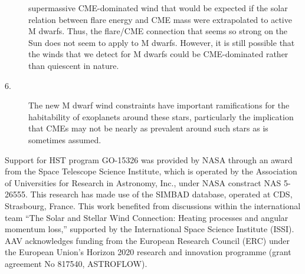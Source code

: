 \documentclass[preprint]{aastex}
\begin{document}
\begin{description}
  supermassive CME-dominated wind that would be expected if the solar
  relation between flare energy and CME mass were extrapolated to
  active M dwarfs.  Thus, the flare/CME connection that seems so strong on the
  Sun \citep[e.g.,][]{ana11} does not seem to apply to M dwarfs.
  However, it is still possible that the winds that we detect for M dwarfs
  could be CME-dominated rather than quiescent in nature.
\item[6.] The new M dwarf wind constraints have important ramifications
  for the habitability of exoplanets around these stars, particularly
  the implication that CMEs may not be nearly as prevalent around such
  stars as is sometimes assumed.
\end{description}

\acknowledgments

Support for HST program GO-15326 was provided by NASA through an award from
the Space Telescope Science Institute, which is operated by the Association
of Universities for Research in Astronomy, Inc., under NASA constract
NAS 5-26555.  This research has made use of the SIMBAD database,
operated at CDS, Strasbourg, France.  This work benefited from discussions
within the international team ``The Solar and Stellar Wind Connection:
Heating processes and angular momentum loss,'' supported by the
International Space Science Institute (ISSI).  AAV acknowledges funding
from the European Research Council (ERC) under the European Union's
Horizon 2020 research and innovation programme
(grant agreement No 817540, ASTROFLOW).
\end{document}
